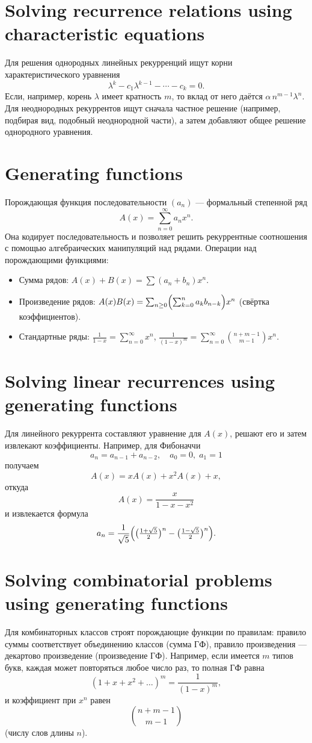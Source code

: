\documentclass{article}
\begin{document}
	\section{Solving recurrence relations using characteristic equations}
	Для решения однородных линейных рекурренций ищут корни характеристического уравнения 
	\[
	\lambda^k - c_1 \lambda^{k-1} - \cdots - c_k = 0.
	\]
	Если, например, корень $\lambda$ имеет кратность $m$, то вклад от него даётся $\alpha\,n^{m-1}\lambda^n$. Для неоднородных рекуррентов ищут сначала частное решение (например, подбирая вид, подобный неоднородной части), а затем добавляют общее решение однородного уравнения.
	
	\section{Generating functions}
	Порождающая функция последовательности $(a_n)$ --- формальный степенной ряд
	\[
	A(x) = \sum_{n=0}^\infty a_n x^n.
	\]
	Она кодирует последовательность и позволяет решить рекуррентные соотношения с помощью алгебраических манипуляций над рядами. Операции над порождающими функциями:
	\begin{itemize}
		\item Сумма рядов: $A(x)+B(x)=\sum (a_n+b_n)x^n$.
		\item Произведение рядов: $A(x)B(x)=\sum_{n\ge0}\Bigl(\sum_{k=0}^n a_k b_{n-k}\Bigr)x^n$ (свёртка коэффициентов).
		\item Стандартные ряды: $\frac{1}{1-x}=\sum_{n=0}^\infty x^n$, \;$\frac{1}{(1-x)^m}=\sum_{n=0}^\infty \binom{n+m-1}{m-1}x^n$.
	\end{itemize}
	
	\section{Solving linear recurrences using generating functions}
	Для линейного рекуррента составляют уравнение для $A(x)$, решают его и затем извлекают коэффициенты. Например, для Фибоначчи 
	\[
	a_n = a_{n-1} + a_{n-2},\quad a_0=0,\;a_1=1
	\]
	получаем 
	\[
	A(x) = xA(x) + x^2 A(x) + x,
	\]
	откуда 
	\[
	A(x)=\frac{x}{1-x-x^2}
	\]
	и извлекается формула 
	\[
	a_n = \frac{1}{\sqrt5}\Bigl(\bigl(\tfrac{1+\sqrt5}2\bigr)^n - \bigl(\tfrac{1-\sqrt5}2\bigr)^n\Bigr).
	\]
	
	\section{Solving combinatorial problems using generating functions}
	Для комбинаторных классов строят порождающие функции по правилам: правило суммы соответствует объединению классов (сумма ГФ), правило произведения --- декартово произведение (произведение ГФ). Например, если имеется $m$ типов букв, каждая может повторяться любое число раз, то полная ГФ равна 
	\[
	(1+x+x^2+\dots)^m = \frac{1}{(1-x)^m},
	\]
	и коэффициент при $x^n$ равен 
	\[
	\binom{n+m-1}{m-1}
	\]
	(числу слов длины $n$).
	
\end{document}
